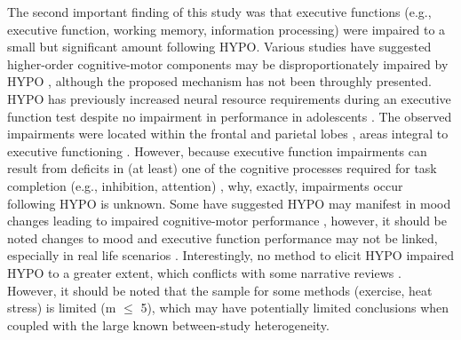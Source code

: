 The second important finding of this study was that executive functions (e.g., executive function, working memory, information processing) were impaired to a small but significant amount following HYPO. Various studies have suggested higher-order cognitive-motor components may be disproportionately impaired by HYPO \cite{tomporowski_effects_2007, lieberman_hydration_2007,grandjean_dehydration_2007,nuccio_fluid_2017}, although the proposed mechanism has not been throughly presented. HYPO has previously increased neural resource requirements during an executive function test despite no impairment in performance in adolescents \cite{kempton_dehydration_2011}. The observed impairments were located within the frontal and parietal lobes \cite{kempton_dehydration_2011}, areas integral to executive functioning \cite{logue_neural_2014}. However, because executive function impairments can result from deficits in (at least) one of the cognitive processes required for task completion (e.g., inhibition, attention) \cite{logue_neural_2014}, why, exactly, impairments occur following HYPO is unknown. Some have suggested HYPO may manifest in mood changes leading to impaired cognitive-motor performance \cite{masento_effects_2014}, however, it should be noted changes to mood and executive function performance may not be linked, especially in real life scenarios \cite{lagner_mood_2015}. Interestingly, no method to elicit HYPO impaired HYPO to a greater extent, which conflicts with some narrative reviews \cite{nuccio_fluid_2017}. However, it should be noted that the sample for some methods (exercise, heat stress) is limited (m ${\leq}$ 5), which may have potentially limited conclusions when coupled with the large known between-study heterogeneity.     

